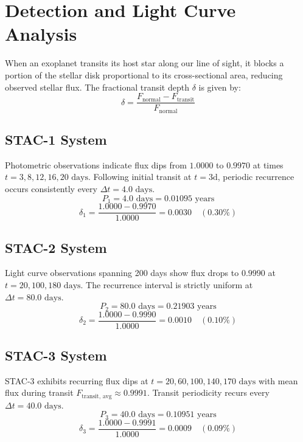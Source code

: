 \documentclass[journal,10pt,twocolumn]{IEEEtran}
\begin{document}
\section{Detection and Light Curve Analysis}
When an exoplanet transits its host star along our line of sight, it blocks a portion of the stellar disk proportional to its cross-sectional area, reducing observed stellar flux. The fractional transit depth $\delta$ is given by:
\begin{equation}
\delta = \frac{F_{\text{normal}} - F_{\text{transit}}}{F_{\text{normal}}}
\end{equation}

\subsection{STAC-1 System}
Photometric observations indicate flux dips from $1.0000$ to $0.9970$ at times $t = 3, 8, 12, 16, 20\text{ days}$. Following initial transit at $t = 3\text{d}$, periodic recurrence occurs consistently every $\Delta t = 4.0\text{ days}$.
\begin{equation}
P_1 = 4.0\text{ days} = 0.01095\text{ years}
\end{equation}
\begin{equation}
\delta_1 = \frac{1.0000 - 0.9970}{1.0000} = 0.0030 \quad (0.30\%)
\end{equation}

\subsection{STAC-2 System}
Light curve observations spanning 200 days show flux drops to $0.9990$ at $t = 20, 100, 180\text{ days}$. The recurrence interval is strictly uniform at $\Delta t = 80.0\text{ days}$.
\begin{equation}
P_2 = 80.0\text{ days} = 0.21903\text{ years}
\end{equation}
\begin{equation}
\delta_2 = \frac{1.0000 - 0.9990}{1.0000} = 0.0010 \quad (0.10\%)
\end{equation}

\subsection{STAC-3 System}
STAC-3 exhibits recurring flux dips at $t = 20, 60, 100, 140, 170\text{ days}$ with mean flux during transit $F_{\text{transit, avg}} \approx 0.9991$. Transit periodicity recurs every $\Delta t = 40.0\text{ days}$.
\begin{equation}
P_3 = 40.0\text{ days} = 0.10951\text{ years}
\end{equation}
\begin{equation}
\delta_3 = \frac{1.0000 - 0.9991}{1.0000} = 0.0009 \quad (0.09\%)
\end{equation}
\end{document}
